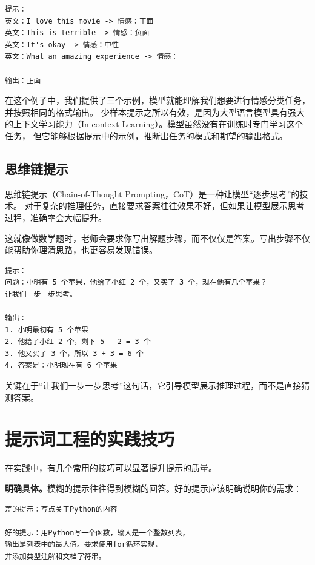 \begin{verbatim}
提示：
英文：I love this movie -> 情感：正面
英文：This is terrible -> 情感：负面
英文：It's okay -> 情感：中性
英文：What an amazing experience -> 情感：

输出：正面
\end{verbatim}

在这个例子中，我们提供了三个示例，模型就能理解我们想要进行情感分类任务，并按照相同的格式输出。
少样本提示之所以有效，是因为大型语言模型具有强大的上下文学习能力（In-context Learning）。模型虽然没有在训练时专门学习这个任务，
但它能够根据提示中的示例，推断出任务的模式和期望的输出格式。

\subsection{思维链提示}

思维链提示（Chain-of-Thought Prompting，CoT）是一种让模型“逐步思考”的技术。
对于复杂的推理任务，直接要求答案往往效果不好，但如果让模型展示思考过程，准确率会大幅提升。

这就像做数学题时，老师会要求你写出解题步骤，而不仅仅是答案。写出步骤不仅能帮助你理清思路，也更容易发现错误。

\begin{verbatim}
提示：
问题：小明有 5 个苹果，他给了小红 2 个，又买了 3 个，现在他有几个苹果？
让我们一步一步思考。

输出：
1. 小明最初有 5 个苹果
2. 他给了小红 2 个，剩下 5 - 2 = 3 个
3. 他又买了 3 个，所以 3 + 3 = 6 个
4. 答案是：小明现在有 6 个苹果
\end{verbatim}

关键在于“让我们一步一步思考”这句话，它引导模型展示推理过程，而不是直接猜测答案。

\section{提示词工程的实践技巧}

在实践中，有几个常用的技巧可以显著提升提示的质量。

\textbf{明确具体。}模糊的提示往往得到模糊的回答。好的提示应该明确说明你的需求：

\begin{verbatim}
差的提示：写点关于Python的内容

好的提示：用Python写一个函数，输入是一个整数列表，
输出是列表中的最大值。要求使用for循环实现，
并添加类型注解和文档字符串。
\end{verbatim}

